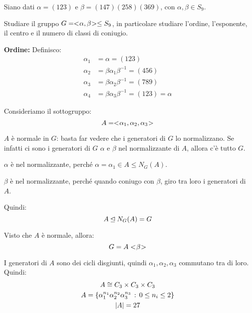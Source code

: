 \begin{esercizio}
    Siano dati $\alpha = (123)$ e $\beta = (147)(258)(369)$, con $\alpha, \beta \in S_9$.

    Studiare il gruppo $G = < \negmedspace \alpha, \beta \negmedspace > \le S_9$, in particolare studiare l'ordine, l'esponente, il centro
    e il numero di classi di coniugio.
\end{esercizio}
\begin{soluzione}
    \textbf{Ordine:}
    Definisco:
    \begin{align*}
        \alpha_1 &= \alpha = (123) \\
        \alpha_2 &= \beta \alpha_1 \beta^{-1} = (456) \\
        \alpha_3 &= \beta \alpha_2 \beta^{-1} = (789) \\
        \alpha_4 &= \beta \alpha_3 \beta^{-1} = (123) = \alpha
    \end{align*}

    Consideriamo il sottogruppo:
    \begin{equation*}
        A = < \negmedspace \alpha_1, \alpha_2, \alpha_3 \negmedspace >
    \end{equation*}

    $A$ è normale in $G$: basta far vedere che i generatori di $G$ lo normalizzano.
    Se infatti ci sono i generatori di $G$ $\alpha$ e $\beta$ nel normalizzante di $A$, allora c'è tutto $G$.

    $\alpha$ è nel normalizzante, perché $\alpha = \alpha_1 \in A \le N_G(A)$.

    $\beta$ è nel normalizzante, perché quando coniugo con $\beta$, giro tra loro i generatori di $A$.

    Quindi:
    \begin{equation*}
        A \unlhd N_G(A) = G
    \end{equation*}

    Visto che $A$ è normale, allora:
    \begin{equation*}
        G = A< \negmedspace \beta \negmedspace >
    \end{equation*}

    I generatori di $A$ sono dei cicli disgiunti, quindi $\alpha_1, \alpha_2, \alpha_3$ commutano tra di loro.
    Quindi:
    \begin{gather*}
        A \cong C_3 \times C_3 \times C_3 \\
        A = \{\alpha_1^{n_1}\alpha_2^{n_2}\alpha_3^{n_3} \,:\, 0 \le n_i \le 2\} \\
        \lvert A \rvert = 27
    \end{gather*}


\end{soluzione}
